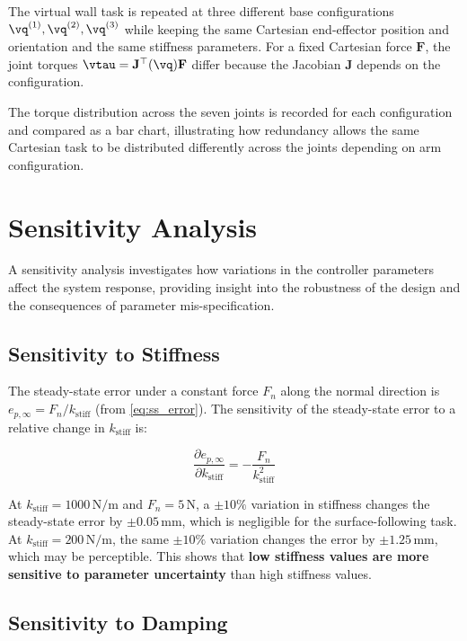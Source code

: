 The virtual wall task is repeated at three different base configurations
$\vq^{(1)}, \vq^{(2)}, \vq^{(3)}$ while keeping the same Cartesian
end-effector position and orientation and the same stiffness parameters.
For a fixed Cartesian force $\mathbf{F}$, the joint torques
$\vtau = \mathbf{J}^\top(\vq)\mathbf{F}$ differ because the Jacobian
$\mathbf{J}$ depends on the configuration.

The torque distribution across the seven joints is recorded for each
configuration and compared as a bar chart, illustrating how redundancy
allows the same Cartesian task to be distributed differently across the
joints depending on arm configuration.

\section{Sensitivity Analysis}
\label{sec:sensitivity}

A sensitivity analysis investigates how variations in the controller
parameters affect the system response, providing insight into the
robustness of the design and the consequences of parameter
mis-specification.

\subsection{Sensitivity to Stiffness}

The steady-state error under a constant force $F_n$ along the normal
direction is $e_{p,\infty} = F_n / k_{\mathrm{stiff}}$ (from
\cref{eq:ss_error}).
The sensitivity of the steady-state error to a relative change in
$k_{\mathrm{stiff}}$ is:

\begin{equation}
\frac{\partial e_{p,\infty}}{\partial k_{\mathrm{stiff}}}
= -\frac{F_n}{k_{\mathrm{stiff}}^2}
\end{equation}

At $k_{\mathrm{stiff}}=1000\,\mathrm{N/m}$ and $F_n=5\,\mathrm{N}$,
a $\pm10\%$ variation in stiffness changes the steady-state error by
$\pm0.05\,\mathrm{mm}$, which is negligible for the surface-following
task.
At $k_{\mathrm{stiff}}=200\,\mathrm{N/m}$, the same $\pm10\%$
variation changes the error by $\pm1.25\,\mathrm{mm}$, which may
be perceptible.
This shows that \textbf{low stiffness values are more sensitive to
parameter uncertainty} than high stiffness values.

\subsection{Sensitivity to Damping}

